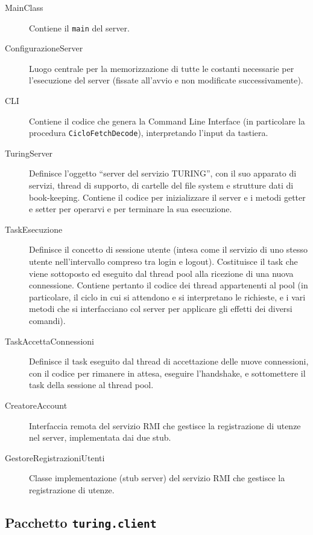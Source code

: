 \documentclass[a4paper,12pt]{article}
\begin{document}
 \begin{description}
  \item[MainClass] Contiene il \texttt{main} del server.
  
  \item[ConfigurazioneServer] Luogo centrale per la memorizzazione di tutte le costanti necessarie per l'esecuzione del server (fissate all'avvio e non modificate successivamente).
  
  \item[CLI] Contiene il codice che genera la Command Line Interface (in particolare la procedura \texttt{CicloFetchDecode}), interpretando l'input da tastiera.
  
  \item[TuringServer] Definisce l'oggetto ``server del servizio TURING'', con il suo apparato di servizi, thread di supporto, di cartelle del file system e strutture dati di book-keeping. Contiene il codice per inizializzare il server e i metodi getter e setter per operarvi e per terminare la sua esecuzione.
  
  \item[TaskEsecuzione] Definisce il concetto di sessione utente (intesa come il servizio di uno stesso utente nell'intervallo compreso tra login e logout). Costituisce il task che viene sottoposto ed eseguito dal thread pool alla ricezione di una nuova connessione. Contiene pertanto il codice dei thread appartenenti al pool (in particolare, il ciclo in cui si attendono e si interpretano le richieste, e i vari metodi che si interfacciano col server per applicare gli effetti dei diversi comandi).
  
  \item[TaskAccettaConnessioni] Definisce il task eseguito dal thread di accettazione delle nuove connessioni, con il codice per rimanere in attesa, eseguire l'handshake, e sottomettere il task della sessione al thread pool.
  
  \item[CreatoreAccount] Interfaccia remota del servizio RMI che gestisce la registrazione di utenze nel server, implementata dai due stub.
  
  \item[GestoreRegistrazioniUtenti] Classe implementazione (stub server) del servizio RMI che gestisce la registrazione di utenze.
 \end{description}
 
  \subsection{ Pacchetto \texttt{turing.client} }
  
\end{document}
